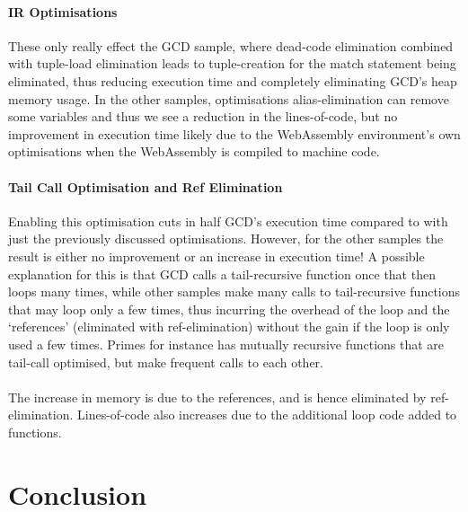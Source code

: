 \documentclass[12pt,twoside,notitlepage]{report}
\newcommand{\cfbox}[2]{%
	\colorlet{currentcolor}{.}%
	{\color{#1}%
		\fbox{\color{currentcolor}#2}}%
}
\newcommand\note[1]{\noindent\cfbox{blue}{\parbox{\textwidth}{\textcolor{blue}{#1}}}}
\begin{document}
\subsubsection{IR Optimisations}
These only really effect the GCD sample, where dead-code elimination combined with tuple-load elimination leads to tuple-creation for the match statement being eliminated, thus reducing execution time and completely eliminating GCD's heap memory usage. In the other samples, optimisations alias-elimination can remove some variables and thus we see a reduction in the lines-of-code, but no improvement in execution time likely due to the WebAssembly environment's own optimisations when the WebAssembly is compiled to machine code.

\subsubsection{Tail Call Optimisation and Ref Elimination}
Enabling this optimisation cuts in half GCD's execution time compared to with just the previously discussed optimisations. However, for the other samples the result is either no improvement or an increase in execution time! A possible explanation for this is that GCD calls a tail-recursive function once that then loops many times, while other samples make many calls to tail-recursive functions that may loop only a few times, thus incurring the overhead of the loop and the `references' (eliminated with ref-elimination) without the gain if the loop is only used a few times. Primes for instance has mutually recursive functions that are tail-call optimised, but make frequent calls to each other.
\\\\
The increase in memory is due to the references, and is hence eliminated by ref-elimination. Lines-of-code also increases due to the additional loop code added to functions.






\clearpage
\chapter{Conclusion}
\note{This chapter is likely to be very short and it may well refer back to the Introduction. It might properly explain how you would have planned the project if starting again with the benefit of hindsight. }
\end{document}
